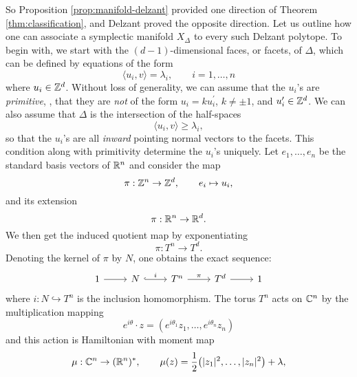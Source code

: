 So Proposition \ref{prop:manifold-delzant} provided one direction of Theorem \ref{thm:classification}, and Delzant proved the opposite direction. Let us outline how one can associate a symplectic manifold $X_{\Delta}$ to every such Delzant polytope. To begin with, we start with the $(d-1)$-dimensional faces, or facets, of $\Delta$, which can be defined by equations of the form
\begin{equation*}
	\langle u_{i}, v \rangle = \lambda_{i},\qquad i = 1,\ldots, n
\end{equation*}
where $u_{i} \in \mathbb{Z}^{d}$. Without loss of generality, we can assume that the $u_{i}$'s are \emph{primitive}, \ie, that they are \emph{not} of the form $u_{i} = ku_{i}^{\prime}$, $k \neq \pm 1$, and $u_{i}^{\prime} \in \mathbb{Z}^{d}$. We can also assume that $\Delta$ is the intersection of the half-spaces
\begin{equation*}
	\langle u_{i}, v \rangle \geq \lambda_{i},
\end{equation*}
so that the $u_{i}$'s are all \emph{inward} pointing normal vectors to the facets. This condition along with primitivity determine the $u_{i}$'s uniquely. Let $e_{1},\ldots, e_{n}$ be the standard basis vectors of $\mathbb{R}^{n}$ and consider the map
\begin{equation*}
	\pi: \mathbb{Z}^{n} \rightarrow \mathbb{Z}^{d},\qquad e_{i} \mapsto u_{i},
\end{equation*}
and its extension
\begin{equation*}
	\pi: \mathbb{R}^{n} \rightarrow \mathbb{R}^{d}.
\end{equation*}
We then get the induced quotient map by exponentiating
\begin{equation*}
	\pi: T^{n} \rightarrow T^{d}.
\end{equation*}
Denoting the kernel of $\pi$ by $N$, one obtains the exact sequence:
\[
\begin{tikzcd}
1 \arrow[r] & N \arrow[r, hook, "i"] & T^{n} \arrow[r, "\pi"] &
T^{d} \arrow[r] & 1
\end{tikzcd}
\]
where $i:N \hookrightarrow T^{n}$ is the inclusion homomorphism. The torus $T^{n}$ acts on $\mathbb{C}^{n}$ by the multiplication mapping
\begin{equation*}
	e^{i\theta}\cdot z = (e^{i\theta_{1}}z_{1},\ldots, e^{i\theta_{n}}z_{n})
\end{equation*}
and this action is Hamiltonian with moment map
\begin{equation*}
	\mu: \mathbb{C}^{n} \rightarrow (\mathbb{R}^{n})^{\ast},\qquad \mu(z) = \frac{1}{2}\big( |z_{1}|^{2},\ldots, |z_{n}|^{2} \big) + \lambda,
\end{equation*}

